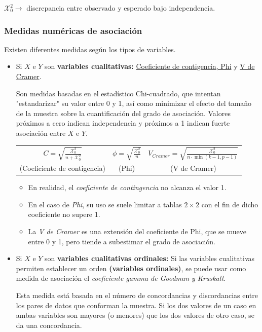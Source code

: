 $\mathcal{X}_{0}^{2}\longrightarrow$ discrepancia entre observado y esperado bajo independencia.
\subsubsection{Medidas numéricas de asociación}

Existen diferentes medidas según los tipos de variables.
\begin{itemize}
	\item Si $X$ e $Y$ son \textbf{variables cualitativas:} \underline{Coeficiente de contigencia, Phi} y \underline{V de Cramer}.
	
	Son medidas basadas en el estadístico Chi-cuadrado, que intentan "estandarizar" su valor entre 0 y 1, así como minimizar el efecto del tamaño de la muestra sobre la cuantificación del grado de asociación. Valores próximos a cero indican independencia y próximos a 1 indican fuerte asociación entre $X$ e $Y$. \begin{center}\begin{tabular}{ccc}$C=\sqrt{\frac{\mathcal{X}_{0}^{2}}{n+\mathcal{X}_{0}^{2}}}$ & $\phi=\sqrt{\frac{\mathcal{X}_{0}^{2}}{n}}$ & $V_{Cramer}=\sqrt{\frac{\mathcal{X}_{0}^{2}}{n \cdot \min (k-1,p-1)}}$\\ (Coeficiente de contigencia) & (Phi) & (V de Cramer)\end{tabular}\end{center}
	\begin{itemize}
		\item En realidad, el \textit{coeficiente de contingencia} no alcanza el valor 1.
		\item En el caso de \textit{Phi}, su uso se suele limitar a tablas $2\times 2$ con el fin de dicho coeficiente no supere 1.
		\item La \textit{V de Cramer} es una extensión del coeficiente de Phi, que se mueve entre 0 y 1, pero tiende a subestimar el grado de asociación.
	\end{itemize}
	\item Si $X$ e $Y$ son \textbf{variables cualitativas ordinales:} Si las variables cualitativas permiten establecer un orden \textbf{(variables ordinales)}, se puede usar como medida de asociación el \textit{coeficiente gamma de Goodman y Kruskall}.
	
	Esta medida está basada en el número de concordancias y discordancias entre los pares de datos que conforman la muestra. Si los dos valores de un caso en ambas variables son mayores (o menores) que los dos valores de otro caso, se da una concordancia.
	

\end{itemize}

